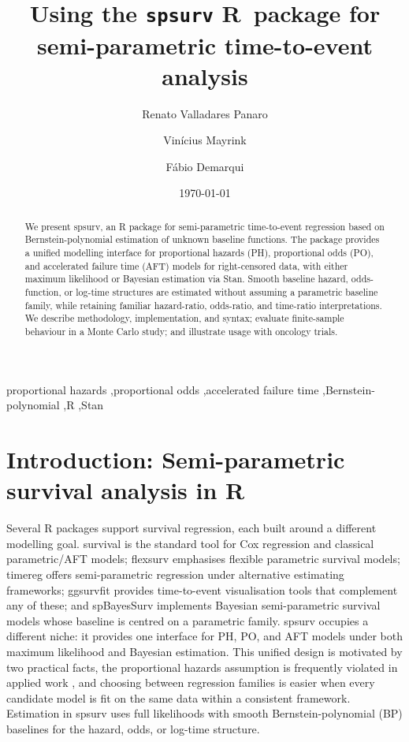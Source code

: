 \documentclass[5p,lefttitle]{elsarticle}
\title{Using the \texttt{spsurv} \textsf{R}~package for semi-parametric time-to-event analysis}
\author[inst1]{Renato Valladares Panaro\corref{cor1}}
\author[inst2]{Vin\'{i}cius Mayrink}
\author[inst2]{F\'{a}bio Demarqui}
\date{\today}
\providecommand{\pkg}[1]{\textsf{#1}}
\begin{document}
\begin{abstract}
We present \pkg{spsurv}, an \textsf{R} package for semi-parametric time-to-event regression based on Bernstein-polynomial estimation of unknown baseline functions. The package provides a unified modelling interface for proportional hazards (PH), proportional odds (PO), and accelerated failure time (AFT) models for right-censored data, with either maximum likelihood or Bayesian estimation via Stan. Smooth baseline hazard, odds-function, or log-time structures are estimated without assuming a parametric baseline family, while retaining familiar hazard-ratio, odds-ratio, and time-ratio interpretations. We describe methodology, implementation, and syntax; evaluate finite-sample behaviour in a Monte Carlo study; and illustrate usage with oncology trials.
\end{abstract}
\begin{keyword}
proportional hazards \sep proportional odds \sep accelerated failure time \sep Bernstein-polynomial \sep R \sep Stan
\end{keyword}
\maketitle


\setcounter{section}{0}
\renewcommand{\thesection}{\arabic{section}}

\section{Introduction: Semi-parametric survival analysis in R}\label{sec:intro}

Several R packages \citep{R:2025} support survival regression, each built around a different modelling goal. \pkg{survival} \citep{survival:2000} is the standard tool for Cox regression and classical parametric/AFT models; \pkg{flexsurv} \citep{flexsurv:2016} emphasises flexible parametric survival models; \pkg{timereg} \citep{timereg} offers semi-parametric regression under alternative estimating frameworks; \pkg{ggsurvfit} \citep{ggsurvfit:2024} provides time-to-event visualisation tools that complement any of these; and \pkg{spBayesSurv} \citep{Zhou:2021} implements Bayesian semi-parametric survival models whose baseline is centred on a parametric family. \pkg{spsurv} occupies a different niche: it provides one interface for PH, PO, and AFT models under both maximum likelihood and Bayesian estimation. This unified design is motivated by two practical facts, the proportional hazards assumption is frequently violated in applied work \citep{kalbfleisch2002statistical}, and choosing between regression families is easier when every candidate model is fit on the same data within a consistent framework. Estimation in \pkg{spsurv} uses full likelihoods with smooth Bernstein-polynomial (BP) baselines for the hazard, odds, or log-time structure.
\end{document}
